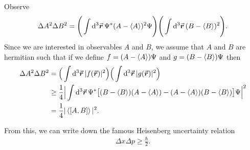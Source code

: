 Observe
\begin{eqnarray}
    \Delta A^2 \Delta B^2 = \Bigg( \int \dd[3]{\va*{r}} \Psi^{*} (A - \expval{A})^2 \Psi \Bigg) \Bigg( \int \dd[3]{\va*{r}} (B - \expval{B})^2 \Bigg)
.\end{eqnarray}
Since we are interested in observables $A$ and $B$, we assume that $A$ and $B$ are hermitian such that if we define $f = (A - \expval{A}) \Psi$ and $g = (B - \expval{B}) \Psi$ then
\begin{align}
        \Delta A^2 \Delta B^2 &= \Big( \int \dd[3]{\va*{r}} |f(\va*{r})|^2 \Big) \Big( \int \dd[3]{\va*{r}} |g(\va*{r})|^2 \Big) \nonumber \\
                              &\geq \frac{1}{4} \Big| \int \dd[3]{\va*{r}} \Psi^{*} \big[ (B - \expval{B})(A - \expval{A}) - (A - \expval{A})(B - \expval{B}) \big] \Psi \Big|^2 \nonumber \\
                              &= \frac{1}{4} |\expval{[A,B]}|^2
.\end{align}

From this, we can write down the famous Heisenberg uncertainty relation
\begin{eqnarray}
    \Delta x \Delta p \geq \frac{\hbar}{2}
.\end{eqnarray}








